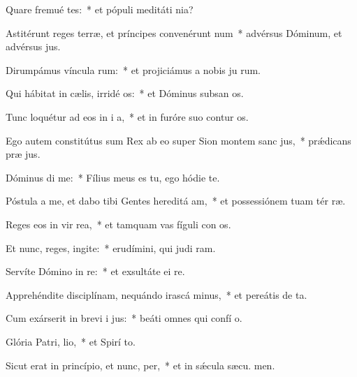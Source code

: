 \item Quare fremué tes:~* et pópuli meditáti  nia?
\item Astitérunt reges terræ, et príncipes convenérunt  num~* advérsus Dóminum, et advérsus  jus.
\item Dirumpámus víncula rum:~* et projiciámus a nobis ju rum.
\item Qui hábitat in cælis, irridé os:~* et Dóminus subsan os.
\item Tunc loquétur ad eos in i a,~* et in furóre suo contur os.
\item Ego autem constitútus sum Rex ab eo super Sion montem sanc jus,~* prǽdicans præ jus.
\item Dóminus di  me:~* Fílius meus es tu, ego hódie  te.
\item Póstula a me, et dabo tibi Gentes hereditá am,~* et possessiónem tuam tér ræ.
\item Reges eos in vir rea,~* et tamquam vas fíguli con os.
\item Et nunc, reges, ingite:~* erudímini, qui judi ram.
\item Servíte Dómino in re:~* et exsultáte ei  re.
\item Apprehéndite disciplínam, nequándo irascá minus,~* et pereátis de  ta.
\item Cum exárserit in brevi i jus:~* beáti omnes qui confí  o.
\item Glória Patri,  lio,~* et Spirí to.
\item Sicut erat in princípio, et nunc,  per,~* et in sǽcula sæcu. men.
